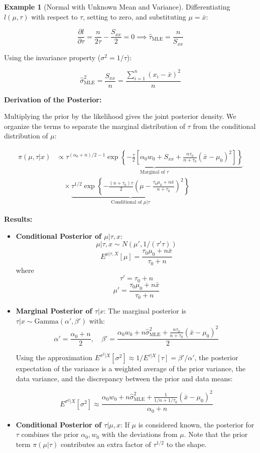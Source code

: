 \documentclass[
  letterpaper,
  DIV=11,
  numbers=noendperiod]{scrreprt}
\renewcommand{\[}{\begin{equation}}
\renewcommand{\]}{\end{equation}}
\theoremstyle{definition}
\theoremstyle{plain}
\theoremstyle{plain}
\theoremstyle{plain}
\theoremstyle{definition}
\newtheorem{example}{Example}[chapter]
\theoremstyle{plain}
\theoremstyle{remark}
\begin{document}
\begin{example}[Normal with Unknown Mean and
Variance]
Differentiating \(l(\mu, \tau)\) with respect to \(\tau\), setting to
zero, and substituting \(\mu = \bar{x}\):

\[
\frac{\partial l}{\partial \tau} = \frac{n}{2\tau} - \frac{S_{xx}}{2} = 0 \implies \hat{\tau}_{\text{MLE}} = \frac{n}{S_{xx}}
\]

Using the invariance property (\(\sigma^2 = 1/\tau\)):

\[
\hat{\sigma}^2_{\text{MLE}} = \frac{S_{xx}}{n} = \frac{\sum_{i=1}^n (x_i - \bar{x})^2}{n}
\]

\textbf{Derivation of the Posterior:}

Multiplying the prior by the likelihood gives the joint posterior
density. We organize the terms to separate the marginal distribution of
\(\tau\) from the conditional distribution of \(\mu\):

\[
\begin{aligned}
\pi(\mu, \tau | x) &\propto \underbrace{\tau^{(\alpha_0 + n)/2 - 1} \exp\left\{ -\frac{\tau}{2} \left[ \alpha_0 w_0 + S_{xx} + \frac{n\tau_0}{n+\tau_0}(\bar{x}-\mu_0)^2 \right] \right\}}_{\text{Marginal of } \tau} \\
&\quad \times \underbrace{\tau^{1/2} \exp\left\{ -\frac{(n+\tau_0)\tau}{2} \left( \mu - \frac{\tau_0\mu_0+n\bar{x}}{n+\tau_0} \right)^2 \right\}}_{\text{Conditional of } \mu|\tau}
\end{aligned}
\]

\textbf{Results:}

\begin{itemize}
\item
  \textbf{Conditional Posterior of \(\mu|\tau, x\)}:
  \[ \mu|\tau, x \sim N(\mu', 1/(\tau'\tau)) \]
  \[ E^{\mu|\tau, X}[\mu] = \frac{\tau_0\mu_0 + n\bar{x}}{\tau_0 + n} \]
  where \[\tau' = \tau_0 + n\]
  \[\mu' = \frac{\tau_0\mu_0 + n\bar{x}}{\tau_0 + n}\]
\item
  \textbf{Marginal Posterior of \(\tau|x\)}: The marginal posterior is
  \(\tau|x \sim \text{Gamma}(\alpha', \beta')\) with: \[
    \alpha' = \frac{\alpha_0 + n}{2}, \quad \beta' = \frac{\alpha_0 w_0 + n\hat{\sigma}^2_{\text{MLE}} + \frac{n\tau_0}{n+\tau_0}(\bar{x}-\mu_0)^2}{2}
    \]

  Using the approximation
  \(E^{\sigma^2|X}[\sigma^2] \approx 1/E^{\tau|X}[\tau] = \beta'/\alpha'\),
  the posterior expectation of the variance is a weighted average of the
  prior variance, the data variance, and the discrepancy between the
  prior and data means:

  \[
    E^{\sigma^2|X}[\sigma^2] \approx \frac{\alpha_0 w_0 + n\hat{\sigma}^2_{\text{MLE}} + \frac{1}{1/n+1/\tau_0}(\bar{x}-\mu_0)^2}{\alpha_0 + n}
    \]
\item
  \textbf{Conditional Posterior of \(\tau|\mu, x\)}: If \(\mu\) is
  considered known, the posterior for \(\tau\) combines the prior
  \(\alpha_0, w_0\) with the deviations from \(\mu\). Note that the
  prior term \(\pi(\mu|\tau)\) contributes an extra factor of
  \(\tau^{1/2}\) to the shape.


\end{itemize}
\end{example}
\end{document}
